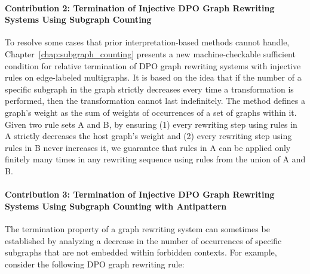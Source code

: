 \paragraph{Contribution 2: Termination of Injective DPO Graph Rewriting Systems Using Subgraph Counting} 
To resolve some cases that prior interpretation-based methods cannot handle, Chapter~\ref{chap:subgraph_counting} presents a new machine-checkable sufficient condition for relative termination of DPO graph rewriting systems with injective rules on edge-labeled multigraphs. 
It is based on the idea that if the number of a specific subgraph in the graph strictly decreases every time a transformation is performed, then the transformation cannot last indefinitely.
The method defines a graph's weight as the sum of weights of occurrences of a set of graphs within it. Given two rule sets A and B, by ensuring 
(1) every rewriting step using rules in A strictly decreases the host graph's weight and 
(2) every rewriting step using rules in B never increases it, we guarantee that rules in A can be applied only finitely many times in any rewriting sequence using rules from the union of A and B. 

\paragraph{Contribution 3: Termination of Injective DPO Graph Rewriting Systems Using Subgraph Counting with Antipattern}
The termination property of a graph rewriting system can sometimes be established by analyzing a decrease in the number of occurrences of specific subgraphs that are not embedded within forbidden contexts. For example, consider the following DPO graph rewriting rule:
 
